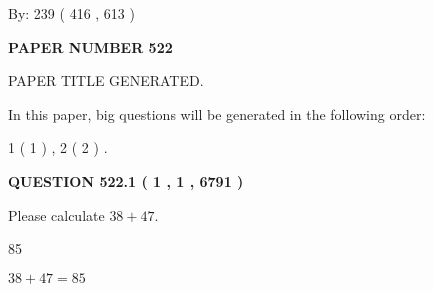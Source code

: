 \documentclass[12pt]{article}
\begin{document}
   
\hspace{1.0in} By: 
 239 ( 416 ,  613 )
   
   
   
   
\newpage 
\setcounter{page}{ 
   522001 } 
   
   
   
   
 {\textbf{ \Large{ PAPER NUMBER  522  }}}
   
   
\vspace{0.2in}
   
   
   
   
   
   
   
   
 \vspace{0.2in}
 
 
 
 
   
   
 PAPER TITLE GENERATED.
   
   
   
\vspace{0.2in}
   
In this paper, big questions will be generated in the following order: 
   
   
   1 ( 1 )
 ,
   2 ( 2 )
 .
  
\vspace{0.2in}
  
{\textbf{\Large{QUESTION
522.1 
 ( 1 , 1 , 6791 )
}}}
  
  
 
Please calculate $ %
38 +  %
47 $.
 
 
 
\noindent{}
 
 

85
 
 
\noindent{}
 
 

 
 
 
\noindent{}
 
 

$ %
38 +  %
47=   %
85$
 
 
\noindent{}
 
\end{document}
